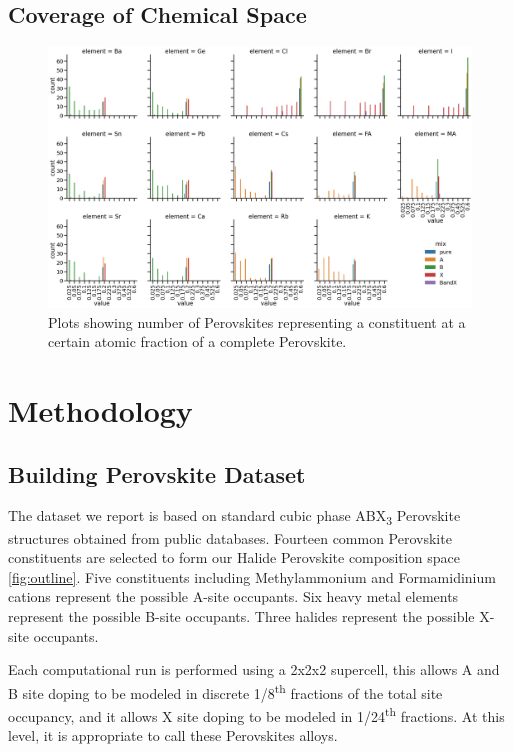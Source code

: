 \documentclass[twoside, twocolumn, 9pt, draft]{article}
\begin{document}
\subsection*{Coverage of Chemical Space}
\label{sec:org9aadc70}

\begin{figure}
\centering
\includegraphics[width=.9\linewidth]{variability_of_composition_vectors.png}
\caption{\label{fig:chemspace_uni} Plots showing number of Perovskites representing a constituent at a certain atomic fraction of a complete Perovskite.}
\end{figure}

\section*{Methodology}
\label{sec:org81d7538}
\subsection*{Building Perovskite Dataset}
\label{sec:org5925fbb}
The dataset we report is based on standard cubic phase ABX\textsubscript{3}
Perovskite structures obtained from public databases. Fourteen common
Perovskite constituents are selected to form our Halide Perovskite
composition space \ref{fig:outline}. Five constituents including
Methylammonium and Formamidinium cations represent the possible A-site
occupants. Six heavy metal elements represent the possible B-site
occupants. Three halides represent the possible X-site occupants.

Each computational run is performed using a 2x2x2 supercell, this
allows A and B site doping to be modeled in discrete 1/8\textsuperscript{th} fractions
of the total site occupancy, and it allows X site doping to be modeled
in 1/24\textsuperscript{th} fractions. At this level, it is appropriate to call these
Perovskites alloys.
\end{document}
